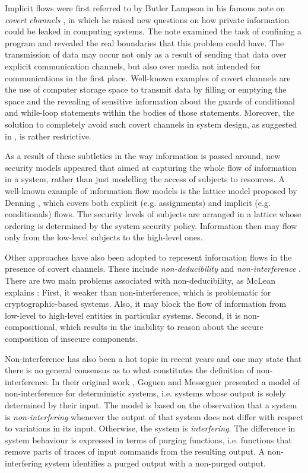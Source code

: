 \documentclass[10pt,a4paper,final,oneside,fleqn]{book}
\begin{document}
Implicit flows were first referred to by Butler Lampson in his famous note on {\itshape covert channels\/} \cite{lamp1}, in which he raised new questions on how private information could be leaked in computing systems.  The note examined the task of confining a program and revealed the real boundaries that this problem could have.  The transmission of data may occur not only as a result of sending that data over explicit communication channels, but also over media not intended for communications in the first place.  Well-known examples of covert channels are the use of computer storage space to transmit data by filling or emptying the space and the revealing of sensitive information about the guards of conditional and while-loop statements within the bodies of those statements.  Moreover, the solution to completely avoid such covert channels in system design, as suggested in \cite[page 3]{lamp1}, is rather restrictive.

As a result of these subtleties in the way information is passed around, new security models appeared that aimed at capturing the whole flow of information in a system, rather than just modelling the access of subjects to resources.  A well-known example of information flow models is the lattice model proposed by Denning \cite{denning1}, which covers both explicit (e.g. assignments) and implicit (e.g. conditionals) flows.  The security levels of subjects are arranged in a lattice whose ordering is determined by the system security policy.  Information then may flow only from the low-level subjects to the high-level ones.

Other approaches have also been adopted to represent information flows in the presence of covert channels. These include {\itshape non-deducibility\/} \cite{sutherland1} and {\itshape non-interference\/} \cite{goguen1}. There are two main problems associated with non-deducibility, as McLean explains \cite{mclean1}: First, it weaker than non-interference, which is problematic for cryptographic-based systems. Also, it may block the flow of information from low-level to high-level entities in particular systems.  Second, it is non-compositional, which results in the inability to reason about the secure composition of insecure components.

Non-interference has also been a hot topic in recent years and one may state that there is no general consensus as to what constitutes the definition of non-interference. In their original work \cite{goguen1}, Goguen and Messeguer presented a model of non-interference for deterministic systems, i.e. systems whose output is solely determined by their input.  The model is based on the observation that a system is {\itshape non-interfering\/} whenever the output of that system does not differ with respect to variations in its input.  Otherwise, the system is {\itshape interfering\/}.  The difference in system behaviour is expressed in terms of purging functions, i.e. functions that remove parts of traces of input commands from the resulting output.  A non-interfering system identifies a purged output with a non-purged output.
\end{document}
